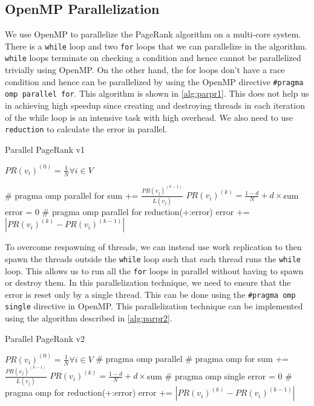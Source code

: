 \documentclass[11pt]{article}
\begin{document}
\subsection{OpenMP Parallelization}
\label{sec:org637b358}
We use OpenMP to parallelize the PageRank algorithm on a multi-core system. There is a \texttt{while} loop and two \texttt{for} loops that we can parallelize in the algorithm. \texttt{while} loops terminate on checking a condition and hence cannot be parallelized trivially using OpenMP. On the other hand, the for loops don't have a race condition and hence can be parallelized by using the OpenMP directive \texttt{\#pragma omp parallel for}. This algorithm is shown in \ref{alg:parpr1}. This does not help us in achieving high speedup since creating and destroying threads in each iteration of the while loop is an intensive task with high overhead. We also need to use \texttt{reduction} to calculate the error in parallel.


\begin{algorithm}
\caption{Parallel PageRank v1}\label{alg:parpr1}
\begin{algorithmic}
\Require $PR(v_{i})^{(0)} = \frac{1}{N} \forall i \in V$

\State \# pragma omp parallel for
\State sum += $ \frac{PR (v_j)^{(k-1)}}{L(v_j)}$
\EndFor
\State $PR(v_{i})^{(k)} = \frac{1-d}{N} + d \times$sum
\EndFor
\State error = 0
\State \# pragma omp parallel for reduction(+:error)
\State error += $ |PR(v_{i})^{(k)} - PR(v_{i})^{(k-1)}|$
\EndFor
\EndWhile
\end{algorithmic}
\end{algorithm}

To overcome respawning of threads, we can instead use work replication to then spawn the threads outside the \texttt{while} loop such that each thread runs the \texttt{while} loop. This allows us to run all the \texttt{for} loops in parallel without having to spawn or destroy them. In this parallelization technique, we need to ensure that the error is reset only by a single thread. This can be done using the \texttt{\#pragma omp single} directive in OpenMP. This parallelization technique can be implemented using the algorithm described in \ref{alg:parpr2}.

\begin{algorithm}
\caption{Parallel PageRank v2}\label{alg:parpr2}
\begin{algorithmic}
\Require $PR(v_{i})^{(0)} = \frac{1}{N} \forall i \in V$
\State \# pragma omp parallel
\State \# pragma omp for
\State sum += $ \frac{PR (v_j)^{(k-1)}}{L(v_j)}$
\EndFor
\State $PR(v_{i})^{(k)} = \frac{1-d}{N} + d \times$sum
\EndFor
\State \# pragma omp single
\State error = 0
\State \# pragma omp for reduction(+:error)
\State error += $ |PR(v_{i})^{(k)} - PR(v_{i})^{(k-1)}|$
\EndFor
\EndWhile
\end{algorithmic}
\end{algorithm}
\end{document}
